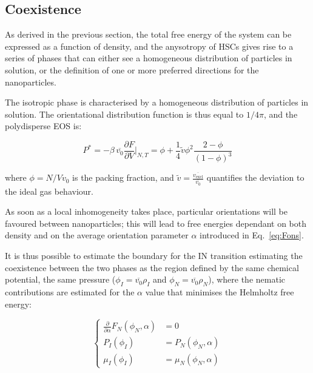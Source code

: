 \documentclass[journal=jacsat,manuscript=article]{achemso}
\begin{document}
\subsection{Coexistence}

As derived in the previous section, the  total free energy of the system can be expressed as a function of density, and the anysotropy of HSCs gives rise to a series of phases that can either see a homogeneous distribution of particles in solution, or the definition of one or more preferred directions for the nanoparticles. 

The isotropic phase is characterised by a homogeneous distribution of particles in solution. The orientational distribution function is thus equal to $1/4\pi$, and the polydisperse EOS is:

\begin{equation}
	P^* =  - \beta \, \overline{v_0} \frac{\partial F}{\partial V} \Bigg \rvert _{N, T} = \phi + \frac{1}{4} \tilde{v} \phi^2 \frac{2 - \phi}{(1 - \phi)^3} \label{ParsonLee}
\end{equation}

where $\phi=N/V v_0$ is the packing fraction, and   $\tilde{v} = \frac{\overline{v_\mathrm{excl}}}{\overline{v_0}}$ quantifies the deviation to the ideal gas behaviour.

As soon as a local inhomogeneity takes place, particular orientations will be favoured between nanoparticles; this will lead to free energies dependant on both density and on  the average orientation parameter $\alpha$ introduced in  Eq.~\ref{eq:Fons}.
 
It is thus possible to estimate the boundary for the IN transition estimating the coexistence between the two phases as the region defined by the same chemical potential, the same pressure ($\phi_I = \overline{v_0} \rho_I$ and $\phi_N = \overline{v_0} \rho_N$), where the nematic contributions are estimated for the  $\alpha$ value that  minimises the Helmholtz free energy:

\begin{equation}
\begin{cases}
	\frac{\partial}{\partial \alpha}  F_N(\phi_N, \alpha) &= 0\\
	P_I(\phi_I) &= P_N(\phi_N, \alpha) \\
	\mu_I(\phi_I) &= \mu_N(\phi_N, \alpha)
\end{cases}
\end{equation}


\end{document}
